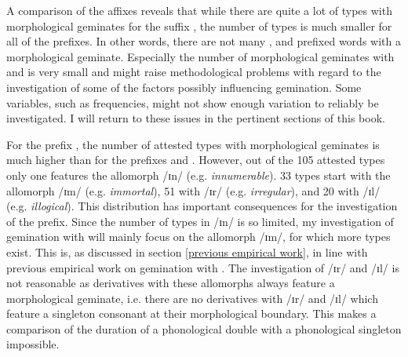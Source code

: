 A comparison of the affixes reveals that while there are quite a lot of types with morphological geminates for the suffix , the number of types is much smaller for all of the prefixes. In other words, there are not many ,  and prefixed words with a morphological geminate. Especially the number of morphological geminates with  and  is very small and might raise methodological problems with regard to the investigation of some of the factors possibly influencing gemination. Some variables, such as frequencies, might not show enough variation to reliably be investigated. I will return to these issues in the pertinent sections of this book.

For the prefix , the number of attested types with morphological geminates is much higher than for the prefixes  and . However, out of the 105 attested types only one features the allomorph /ɪn/ (e.g. \textit{innumerable}). 33 types start with the allomorph /ɪm/ (e.g. \textit{immortal}), 51 with /ɪr/ (e.g. \textit{irregular}), and 20 with /ɪl/ (e.g. \textit{illogical}). 
This distribution has important consequences for the investigation of the prefix. Since the number of types in /ɪn/ is so limited, my investigation of gemination with  will mainly focus on the allomorph /ɪm/, for which more types exist. This is, as discussed in section \ref{previous empirical work}, in line with previous empirical work on gemination with .
The investigation of /ɪr/  and /ɪl/ is not reasonable as derivatives with these allomorphs always feature a morphological geminate, i.e. there are no derivatives with /ɪr/  and /ɪl/ which feature a singleton consonant at their morphological boundary. This makes a comparison of the duration of a phonological double with a phonological singleton impossible.
